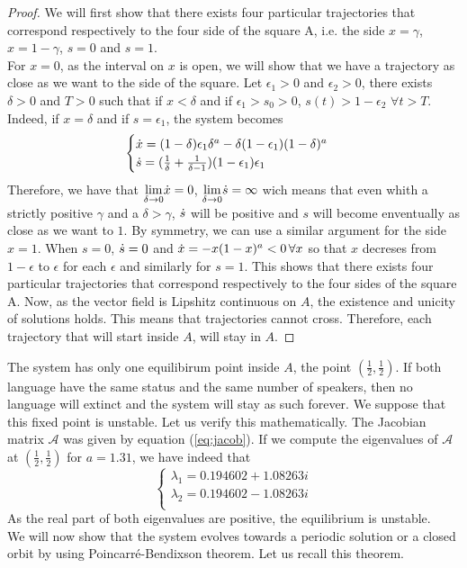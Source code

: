 \documentclass{article}
\begin{document}
\begin{proof}
We will first show that there exists four particular trajectories that correspond respectively to the four side of the square A, i.e. the side $x=\gamma$, $x=1-\gamma$, $s=0$ and $s=1$. \\
For $x=0$, as the interval on $x$ is open, we will show that we have a trajectory as close as we want to the side of the square.
Let $\epsilon_1>0$ and $\epsilon_2 >0$, there exists $\delta > 0$ and $T > 0$ such that if $x < \delta$ and  if $\epsilon_1>s_0>0$, $s(t) > 1- \epsilon_2 \, \, \forall t > T$.
Indeed, if $x = \delta$ and  if $s=\epsilon_1$, the system becomes
\[
\begin{cases}
\dot{x} =  (1-\delta)\epsilon_1\delta^a - \delta (1-\epsilon_1) (1-\delta)^a  \\
\dot{s} = (\frac{1}{\delta}+\frac{1}{\delta-1})(1-\epsilon_1)\epsilon_1 \\
\end{cases}
\]
Therefore, we have that $\underset{\delta \rightarrow 0}{\text{lim}} \dot{x} = 0$, $\underset{\delta \rightarrow 0}{\text{lim}} \dot{s} = \infty$ wich means that even whith a strictly positive $\gamma$ and a $\delta > \gamma$, $\dot{s}$ will be positive and $s$ will become enventually as close as we want to $1$. By symmetry, we can use a similar argument for the side $x=1$.
When $s=0$, $\dot{s} = 0$ and $\dot{x} = -x(1-x)^a < 0 \, \forall{x}$ so that $x$ decreses from $1-\epsilon$ to $\epsilon$ for each $\epsilon$ and similarly for $s=1$.
This shows that there exists four particular trajectories that correspond respectively to the four sides of the square A.
Now, as the vector field is Lipshitz continuous on $A$, the existence and unicity of solutions holds.
This means that trajectories cannot cross.
Therefore, each trajectory that will start inside $A$, will stay in $A$.
\end{proof}

The system has only one equilibirum point inside $A$, the point $(\frac{1}{2}, \frac{1}{2})$.
If both language have the same status and the same number of speakers, then no language will extinct and the system will stay as such forever.
We suppose that this fixed point is unstable.
Let us verify this mathematically.
The Jacobian matrix $\mathcal{A}$ was given by equation (\ref{eq:jacob}).
If we compute the eigenvalues of $\mathcal{A}$ at $(\frac{1}{2}, \frac{1}{2})$ for $a=1.31$, we have indeed that
\[
\begin{cases}
\lambda_1 = 0.194602+1.08263i \\
\lambda_2 = 0.194602-1.08263i \\
\end{cases}
\]
As the real part of both eigenvalues are positive, the equilibrium is unstable. \\
We will now show that the system evolves towards a periodic solution or a closed orbit by using Poincarré-Bendixson theorem.
Let us recall this theorem. \\
\end{document}
